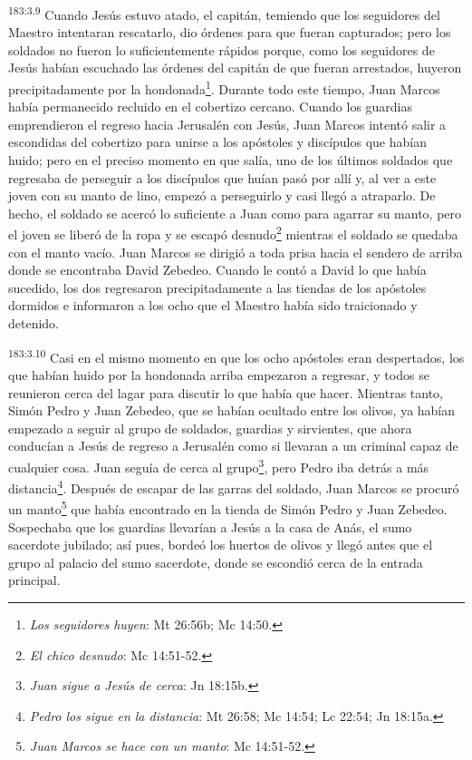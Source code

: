 \par 
\textsuperscript{183:3.9} Cuando Jesús estuvo atado, el capitán, temiendo que los seguidores del Maestro intentaran rescatarlo, dio órdenes para que fueran capturados; pero los soldados no fueron lo suficientemente rápidos porque, como los seguidores de Jesús habían escuchado las órdenes del capitán de que fueran arrestados, huyeron precipitadamente por la hondonada\footnote{\textit{Los seguidores huyen}: Mt 26:56b; Mc 14:50.}. Durante todo este tiempo, Juan Marcos había permanecido recluido en el cobertizo cercano. Cuando los guardias emprendieron el regreso hacia Jerusalén con Jesús, Juan Marcos intentó salir a escondidas del cobertizo para unirse a los apóstoles y discípulos que habían huido; pero en el preciso momento en que salía, uno de los últimos soldados que regresaba de perseguir a los discípulos que huían pasó por allí y, al ver a este joven con su manto de lino, empezó a perseguirlo y casi llegó a atraparlo. De hecho, el soldado se acercó lo suficiente a Juan como para agarrar su manto, pero el joven se liberó de la ropa y se escapó desnudo\footnote{\textit{El chico desnudo}: Mc 14:51-52.} mientras el soldado se quedaba con el manto vacío. Juan Marcos se dirigió a toda prisa hacia el sendero de arriba donde se encontraba David Zebedeo. Cuando le contó a David lo que había sucedido, los dos regresaron precipitadamente a las tiendas de los apóstoles dormidos e informaron a los ocho que el Maestro había sido traicionado y detenido.

\par 
\textsuperscript{183:3.10} Casi en el mismo momento en que los ocho apóstoles eran despertados, los que habían huido por la hondonada arriba empezaron a regresar, y todos se reunieron cerca del lagar para discutir lo que había que hacer. Mientras tanto, Simón Pedro y Juan Zebedeo, que se habían ocultado entre los olivos, ya habían empezado a seguir al grupo de soldados, guardias y sirvientes, que ahora conducían a Jesús de regreso a Jerusalén como si llevaran a un criminal capaz de cualquier cosa. Juan seguía de cerca al grupo\footnote{\textit{Juan sigue a Jesús de cerca}: Jn 18:15b.}, pero Pedro iba detrás a más distancia\footnote{\textit{Pedro los sigue en la distancia}: Mt 26:58; Mc 14:54; Lc 22:54; Jn 18:15a.}. Después de escapar de las garras del soldado, Juan Marcos se procuró un manto\footnote{\textit{Juan Marcos se hace con un manto}: Mc 14:51-52.} que había encontrado en la tienda de Simón Pedro y Juan Zebedeo. Sospechaba que los guardias llevarían a Jesús a la casa de Anás, el sumo sacerdote jubilado; así pues, bordeó los huertos de olivos y llegó antes que el grupo al palacio del sumo sacerdote, donde se escondió cerca de la entrada principal.

